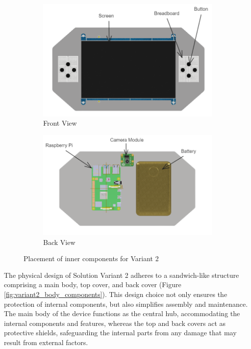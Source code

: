 \begin{figure}[h!]
    \centering
    \begin{subfigure}[c]{0.5\textwidth}
        \begin{minipage}{\textwidth}
            \centering
            \includegraphics[height=4 cm]{texs/Part1/chapter4/image/v25.png}
        \end{minipage}
        \caption{Front View}
        \label{fig:variant2_front_view_main}
    \end{subfigure}
    \begin{subfigure}[c]{0.5\textwidth}
        \begin{minipage}{\textwidth}
            \centering
            \includegraphics[height=4 cm]{texs/Part1/chapter4/image/v26.png}
        \end{minipage}
        \caption{Back View}
        \label{fig:variant2_back_view_main}
    \end{subfigure}
    \caption{Placement of inner components for Variant 2}
    \label{fig:variant2_inner_components}
\end{figure}

The physical design of Solution Variant 2 adheres to a sandwich-like structure comprising a main body, top cover, and back cover (Figure \ref{fig:variant2_body_components}). This design choice not only ensures the protection of internal components, but also simplifies assembly and maintenance. The main body of the device functions as the central hub, accommodating the internal components and features, whereas the top and back covers act as protective shields, safeguarding the internal parts from any damage that may result from external factors.


